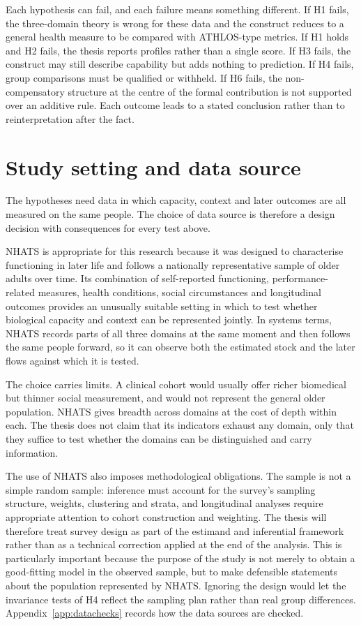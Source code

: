 Each hypothesis can fail, and each failure means something different. If H1 fails, the three-domain theory is wrong for these data and the construct reduces to a general health measure to be compared with ATHLOS-type metrics. If H1 holds and H2 fails, the thesis reports profiles rather than a single score. If H3 fails, the construct may still describe capability but adds nothing to prediction. If H4 fails, group comparisons must be qualified or withheld. If H6 fails, the non-compensatory structure at the centre of the formal contribution is not supported over an additive rule. Each outcome leads to a stated conclusion rather than to reinterpretation after the fact.

\section{Study setting and data source}

The hypotheses need data in which capacity, context and later outcomes are all measured on the same people. The choice of data source is therefore a design decision with consequences for every test above.

NHATS is appropriate for this research because it was designed to characterise functioning in later life and follows a nationally representative sample of older adults over time. Its combination of self-reported functioning, performance-related measures, health conditions, social circumstances and longitudinal outcomes provides an unusually suitable setting in which to test whether biological capacity and context can be represented jointly. In systems terms, NHATS records parts of all three domains at the same moment and then follows the same people forward, so it can observe both the estimated stock and the later flows against which it is tested.

The choice carries limits. A clinical cohort would usually offer richer biomedical but thinner social measurement, and would not represent the general older population. NHATS gives breadth across domains at the cost of depth within each. The thesis does not claim that its indicators exhaust any domain, only that they suffice to test whether the domains can be distinguished and carry information.

The use of NHATS also imposes methodological obligations. The sample is not a simple random sample: inference must account for the survey's sampling structure, weights, clustering and strata, and longitudinal analyses require appropriate attention to cohort construction and weighting. The thesis will therefore treat survey design as part of the estimand and inferential framework rather than as a technical correction applied at the end of the analysis. This is particularly important because the purpose of the study is not merely to obtain a good-fitting model in the observed sample, but to make defensible statements about the population represented by NHATS. Ignoring the design would let the invariance tests of H4 reflect the sampling plan rather than real group differences. Appendix~\ref{app:datachecks} records how the data sources are checked.

